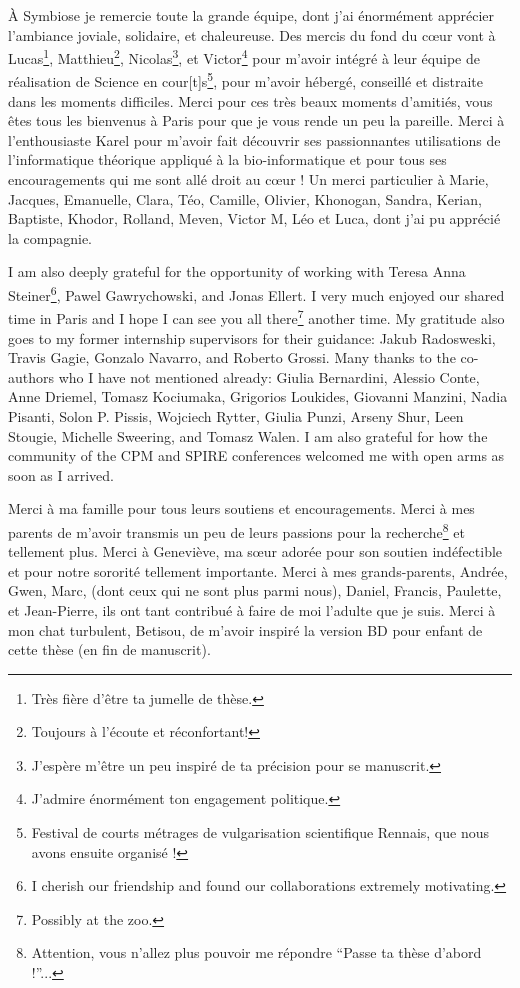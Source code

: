 À Symbiose je remercie toute la grande équipe, dont j'ai énormément apprécier l’ambiance joviale, solidaire, et chaleureuse.
Des mercis du fond du cœur vont à Lucas\footnote{Très fière d’être ta jumelle de thèse.}, Matthieu\footnote{Toujours à l'écoute et réconfortant!},  Nicolas\footnote{J’espère m’être un peu inspiré de ta précision pour se manuscrit.}, et Victor\footnote{J’admire énormément ton engagement politique.}  pour m’avoir intégré à leur équipe de réalisation de Science en cour[t]s\footnote{Festival de courts métrages de vulgarisation scientifique Rennais, que nous avons ensuite organisé !}, pour m’avoir hébergé, conseillé et distraite dans les moments difficiles. Merci pour ces très beaux moments d’amitiés, vous êtes tous les bienvenus à Paris pour que je vous rende un peu la pareille.
Merci à l’enthousiaste Karel pour m’avoir fait découvrir ses passionnantes utilisations de l’informatique théorique appliqué à la bio-informatique et pour tous ses encouragements qui me sont allé droit au cœur !
Un merci particulier à Marie, Jacques, Emanuelle, Clara, Téo, Camille, Olivier, Khonogan, Sandra, Kerian, Baptiste, Khodor, Rolland, Meven, Victor M, Léo et Luca, dont j’ai pu apprécié la compagnie.


I am also deeply grateful for the opportunity of working with Teresa Anna Steiner\footnote{I cherish our friendship and found our collaborations extremely motivating.}, Pawel Gawrychowski, and Jonas Ellert. I very much enjoyed our shared time in Paris and I hope I can see you all there\footnote{Possibly at the zoo.} another time.
My gratitude also goes to my former internship supervisors for their guidance: Jakub Radosweski, Travis Gagie, Gonzalo Navarro, and Roberto Grossi.
Many thanks to the co-authors who I have not mentioned already: Giulia Bernardini, Alessio Conte, Anne Driemel, Tomasz Kociumaka, Grigorios Loukides, Giovanni Manzini, Nadia Pisanti, Solon P. Pissis, Wojciech Rytter, Giulia Punzi, Arseny Shur, Leen Stougie, Michelle Sweering, and Tomasz Walen.
I am also grateful for how the community of the CPM and SPIRE conferences welcomed me with open arms as soon as I arrived.


Merci à ma famille pour tous leurs soutiens et encouragements. Merci à mes parents de m’avoir transmis un peu de leurs passions pour la recherche\footnote{Attention, vous n’allez plus pouvoir me répondre ``Passe ta thèse d’abord !''...} et tellement plus. Merci à Geneviève, ma sœur adorée pour son soutien indéfectible et pour notre sororité tellement importante. Merci à mes grands-parents, Andrée, Gwen, Marc, (dont ceux qui ne sont plus parmi nous), Daniel, Francis, Paulette, et Jean-Pierre, ils ont tant contribué à faire de moi l’adulte que je suis. Merci à mon chat turbulent, Betisou, de m’avoir inspiré la version BD pour enfant de cette thèse (en fin de manuscrit).

